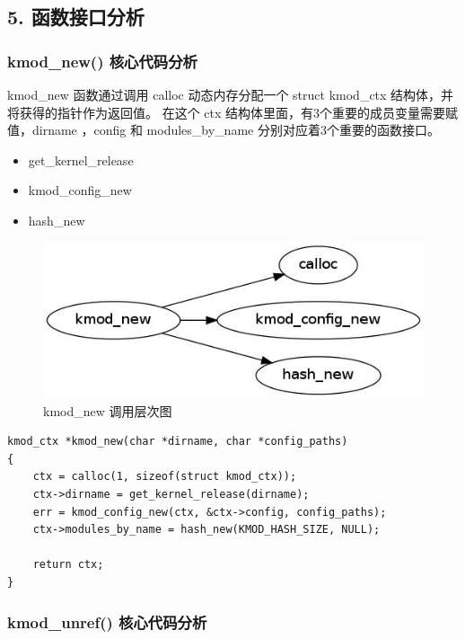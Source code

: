 \documentclass[11pt,a4paper]{article}
\makeatletter
\def\maxwidth{\ifdim\Gin@nat@width>\linewidth\linewidth
\else\Gin@nat@width\fi}
\let\Oldincludegraphics\includegraphics
\renewcommand{\includegraphics}[1]{\Oldincludegraphics[width=\maxwidth]{#1}}
\makeatother
\begin{document}
\subsection{5. 函数接口分析}

\subsubsection{kmod\_new() 核心代码分析}

kmod\_new 函数通过调用 calloc 动态内存分配一个 struct kmod\_ctx
结构体，并将获得的指针作为返回值。 在这个 ctx
结构体里面，有3个重要的成员变量需要赋值，dirname ，config 和
modules\_by\_name 分别对应着3个重要的函数接口。

\begin{itemize}
\item
  get\_kernel\_release
\item
  kmod\_config\_new
\item
  hash\_new
\end{itemize}
\begin{figure}[htbp]
\centering
\includegraphics{./figures/kmod_new.jpg}
\caption{kmod\_new 调用层次图}
\end{figure}

{\begin{shaded}\begin{verbatim}
kmod_ctx *kmod_new(char *dirname, char *config_paths)
{
    ctx = calloc(1, sizeof(struct kmod_ctx));
    ctx->dirname = get_kernel_release(dirname);
    err = kmod_config_new(ctx, &ctx->config, config_paths);
    ctx->modules_by_name = hash_new(KMOD_HASH_SIZE, NULL);

    return ctx;
}
\end{verbatim}\end{shaded}}
\subsubsection{kmod\_unref() 核心代码分析}
\end{document}
